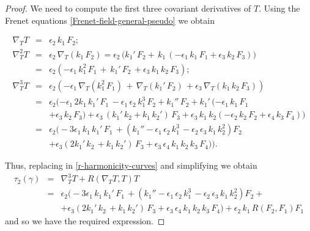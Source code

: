 \documentclass[11pt]{amsart}
\theoremstyle{plain}
\theoremstyle{definition}
\numberwithin{equation}{section}
\begin{document}
\begin{proof}
We need to compute the first three covariant derivatives of $T$. Using the Frenet equations \eqref{Frenet-field-general-pseudo} we obtain
\begin{small}
\begin{eqnarray*}
\nabla_T T &=& \epsilon_2 \, k_1 \, F_2;\\
\nabla_T^2 T &=& \epsilon_2 \, \nabla_T (k_1 \, F_2) = \epsilon_2 \, \big( k_1' \, F_2 + \, k_1 \, (- \epsilon_1 \, k_1 \, F_1 + \epsilon_3 \, k_2 \, F_3 ) \big)\\
& =& \epsilon_2 ( - \epsilon_1 \, k_1^2 \, F_1 \, + \, k_1' \, F_2 \,  + \epsilon_3 \, k_1 \, k_2 \, F_3 ) ;\\
\nabla_T^3 T &=&  \epsilon_2 ( - \epsilon_1 \, \nabla_T (k_1^2 \,  F_1 )\, + \, \nabla_T ( k_1' \, F_2 )\,  + \epsilon_3 \, \nabla_T ( k_1 \,  k_2 \, F_3) ) \\
& =&  \epsilon_2 ( - \epsilon_1 \, 2 k_1 \, k_1' \,  F_1 \, - \epsilon_1 \, \epsilon_2 \, k_1^3 \, F_2 + k_1'' \, F_2  + k_1' \, (-\epsilon_1 \, k_1 \, F_1\\
&&  + \epsilon_3 \, k_2 \, F_3)  + \epsilon_3 \, ( k_1' \,  k_2 + k_1 \,  k_2') \, F_3 + \epsilon_3\,k_1 \, k_2 (-\epsilon_2 \, k_2 \, F_2 + \epsilon_4 \, k_3 \, F_4))\\
&=& \epsilon_2 \Big( - 3 \epsilon_1 \,  k_1 \, k_1' \,  F_1 \, +(k_1'' - \epsilon_1 \, \epsilon_2 \, k_1^3 \, - \epsilon_2 \, \epsilon_3 \, k_1 \, k_2^2) F_2\\
&& + \epsilon_3( 2  k_1'  \, k_2 \, + k_1 \,  k_2') \, F_3 + \epsilon_3 \, \epsilon_4  \,k_1 \, k_2 \, k_3 \, F_4) \Big).
\end{eqnarray*}
\end{small}
Thus, replacing in \eqref{r-harmonicity-curves} and simplifying we obtain
\begin{eqnarray*}
\tau_2(\gamma) & = & \nabla_T^3 T + R(\nabla_T T, T)T \\
&=& \epsilon_2 \big( - 3 \epsilon_1 \,  k_1 \, k_1' \,  F_1 \, +(k_1'' - \epsilon_1 \, \epsilon_2 \, k_1^3 \, - \epsilon_2 \, \epsilon_3 \, k_1 \, k_2^2) F_2 +\\
&&+ \epsilon_3( 2  k_1'  \, k_2 \, + k_1 \,  k_2') \, F_3 + \epsilon_3 \, \epsilon_4  \,k_1 \, k_2 \, k_3 \, F_4 \big) + \epsilon_2 \, k_1 \, R(F_2, F_1) F_1 
\end{eqnarray*}
and so we have the required expression.
\end{proof}
\end{document}
